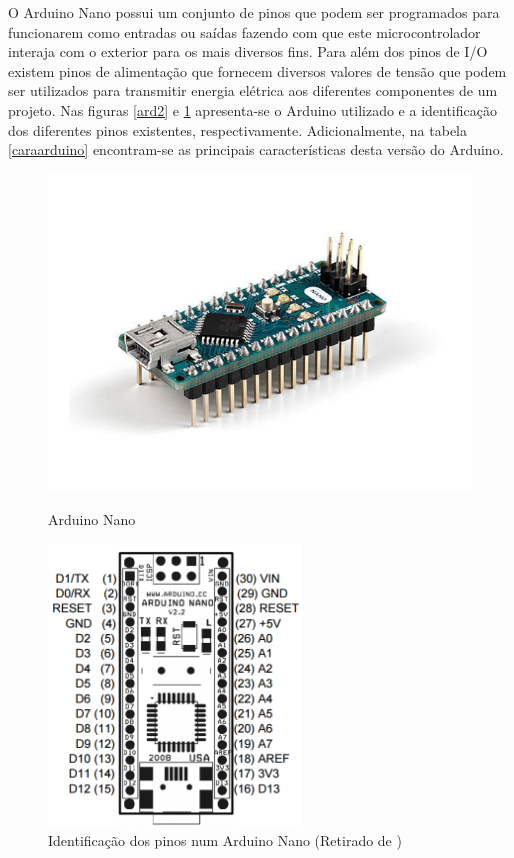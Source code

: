 O Arduino Nano possui um conjunto de pinos que podem ser programados para funcionarem como entradas ou saídas fazendo com que este  microcontrolador interaja com o exterior para os mais diversos fins. Para além dos pinos de \ac{I/O} existem pinos de alimentação que fornecem diversos valores de tensão que podem ser utilizados para transmitir energia elétrica aos diferentes componentes de um projeto\cite{Banzi2012}. Nas figuras \ref{ard2} e \ref{ard1} apresenta-se o Arduino utilizado e a identificação dos diferentes pinos existentes, respectivamente. Adicionalmente, na tabela \ref{caraarduino} encontram-se as principais características desta versão do Arduino.


\newpage
\begin{figure}[h]
	\centering
	\begin{minipage}[b]{0.49\textwidth}
		\centering
		\includegraphics[width=\textwidth]{img/hardware/nano-img.jpg}
		\caption{Arduino Nano}
		\label{ard2}
	\end{minipage}
	\hfill
	\begin{minipage}[b]{0.49\textwidth}
		\centering
		\includegraphics[width=0.6\textwidth]{img/hardware/nano-esquema.png}
		\caption[Identificação dos pinos num Arduino Nano]{Identificação dos pinos num Arduino Nano (Retirado de \cite{arduinonanouser})}
		\label{ard1}
	\end{minipage}
\end{figure}





